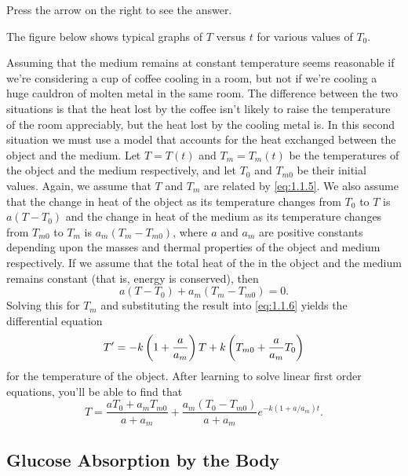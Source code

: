 \documentclass{ximera}
\begin{document}
Press the arrow on the right to see the answer.
 
The figure below shows typical graphs of $T$ versus $t$ for
various values of  $T_0$.

\begin{center}
\end{center}


 
Assuming that the medium remains at constant temperature seems
reasonable if we're considering a cup of coffee cooling in a room, but
 not if we're cooling a huge cauldron of molten
metal in the same room. The difference between the two situations is
that the heat lost by the coffee isn't likely to raise the
temperature of the room appreciably, but the heat lost by the
cooling metal is. In this second situation we must use a model that
accounts for the heat exchanged between the object and the medium. Let
$T=T(t)$ and $T_m=T_m(t)$ be the temperatures of the object and the
medium respectively, and let $T_0$ and $T_{m0}$ be their initial
values. Again, we assume that $T$ and $T_m$ are related by
\eqref{eq:1.1.5}. We also assume that the change in heat of
the object as its temperature changes from $T_0$ to $T$ is $a(T-T_0)$
and  the change in heat of the medium as its temperature changes
from $T_{m0}$ to $T_m$ is $a_m(T_m-T_{m0})$, where $a$ and $a_m$ are
positive constants depending upon the masses and thermal properties of
the object and medium respectively. If we assume that the total heat
of the in the object and the medium remains constant
(that is, energy is conserved), then
$$
a(T-T_0)+a_m(T_m-T_{m0})=0.
$$
Solving this for  $T_m$  and substituting the result into
\eqref{eq:1.1.6} yields the differential equation
$$
T'=-k\left(1+{a\over a_m}\right)T
+k\left(T_{m0}+{a\over a_m}T_0\right)
$$
for the temperature of the object.  After learning to solve linear
first order  equations, you'll be able to find that
$$
T=\frac{aT_0+a_mT_{m0}}
{a+a_m}+\frac{a_m(T_0-T_{m0})}{a+a_m}e^{-k(1+a/a_m)t}.
$$
 
\subsection*{Glucose Absorption by the Body}
 
\end{document}
